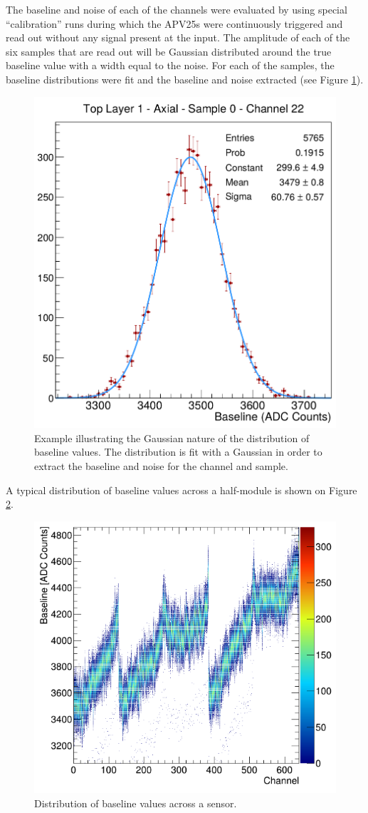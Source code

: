 The baseline and noise of each of the channels were evaluated by using 
special ``calibration'' runs during which the APV25s were continuously triggered
and read out without any signal present at the input.  The amplitude
of each of the six samples that are 
read out will be Gaussian distributed around the true baseline value with a 
width equal to the noise.  For each of the samples, the baseline distributions
were fit and the baseline and noise extracted (see Figure \ref{fig:baseline_fit}).
\begin{figure}[h!t]
    \centering
    \includegraphics[width=.6\textwidth]{images/baseline_fit_top_l1_axial_sample0_ch22.png}
    \caption{Example illustrating the Gaussian nature of the distribution of
             baseline values.  The distribution is fit with a Gaussian in order 
             to extract the baseline and noise for the channel and sample.}
    \label{fig:baseline_fit}
\end{figure}
A typical distribution of baseline values across a half-module is shown on 
Figure \ref{fig:baseline}.  
\begin{figure}[h!t] 
    \centering
    \includegraphics[width=.7\textwidth]{images/baseline.png}
    \caption{Distribution of baseline values across a sensor.}
    \label{fig:baseline}
\end{figure}  
